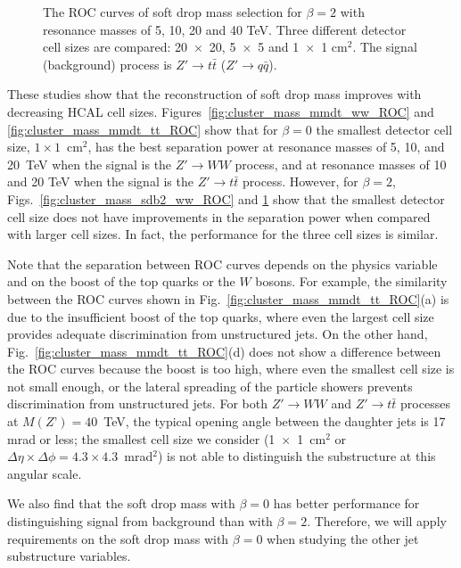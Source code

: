 \begin{figure}
\begin{center}
\end{center}
\caption{
The ROC curves of soft drop mass selection for $\beta=2$
with resonance masses of 5, 10, 20 and 40 TeV. 
Three different detector cell sizes are compared: 20~$\times$~20, 
5~$\times$~5 and 1~$\times$~1 cm$^2$. 
The signal (background) process is $Z'\rightarrow t\bar{t}$
($Z' \rightarrow q\bar{q}$).
}
\label{fig:cluster_mass_sdb2_tt_ROC}
\end{figure}

These studies show that the reconstruction of soft drop mass improves with decreasing  HCAL cell sizes.
Figures~\ref{fig:cluster_mass_mmdt_ww_ROC} and 
\ref{fig:cluster_mass_mmdt_tt_ROC} show that for $\beta=0$ the 
smallest detector cell size, 
$1\times1$~cm$^2$, has the best separation power at 
resonance masses of 5, 10, and 20~TeV when the signal is the $Z' \rightarrow WW$ process,  and 
at  resonance masses of 10 and 20 TeV when the signal is the $Z' \rightarrow t\bar{t}$ process.
However, for $\beta=2$, Figs.~\ref{fig:cluster_mass_sdb2_ww_ROC} and \ref{fig:cluster_mass_sdb2_tt_ROC} 
show that the smallest detector cell size 
does not have improvements in the separation power when compared with 
larger cell sizes. In fact, the performance for the three cell sizes is  
similar. 

Note that the separation between ROC curves depends 
on the physics variable and on the boost of the top quarks or the $W$ bosons. For example, 
the similarity between the ROC curves shown in Fig.~\ref{fig:cluster_mass_mmdt_tt_ROC}(a)
is due to the insufficient boost of the top quarks, 
 where even the largest cell size provides adequate discrimination from unstructured jets.
On the other hand, Fig.~\ref{fig:cluster_mass_mmdt_tt_ROC}(d) does not show a difference 
between the ROC curves because the boost is too high,  where even the smallest  cell size is not small enough, or the lateral spreading of the particle showers 
 prevents discrimination from unstructured jets. For both $Z' \to WW$ and $Z' \to t \bar{t}$ processes at $M(Z’) = 40$~TeV, the typical opening angle between the daughter jets 
 is 17 mrad or less; the smallest cell size we consider (1~$\times$~1~cm$^2$ or $\Delta \eta \times \Delta \phi = 4.3 \times 4.3$~mrad$^2$) 
 is not able to distinguish the substructure at this angular scale.  

We also find that the  soft drop mass with $\beta=0$ has better 
performance for distinguishing signal from background than with  $\beta=2$. Therefore, we will 
apply requirements on the soft drop mass with $\beta=0$  when studying the other jet substructure 
variables. 
 

